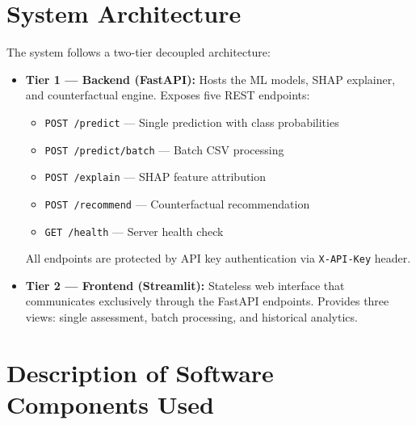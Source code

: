 \documentclass[12pt,a4paper]{report}
\begin{document}
\section{System Architecture}

The system follows a two-tier decoupled architecture:

\begin{itemize}
    \item \textbf{Tier 1 --- Backend (FastAPI):} Hosts the ML models, SHAP explainer, and counterfactual engine. Exposes five REST endpoints:
    \begin{itemize}
        \item \texttt{POST /predict} --- Single prediction with class probabilities
        \item \texttt{POST /predict/batch} --- Batch CSV processing
        \item \texttt{POST /explain} --- SHAP feature attribution
        \item \texttt{POST /recommend} --- Counterfactual recommendation
        \item \texttt{GET /health} --- Server health check
    \end{itemize}
    All endpoints are protected by API key authentication via \texttt{X-API-Key} header.

    \item \textbf{Tier 2 --- Frontend (Streamlit):} Stateless web interface that communicates exclusively through the FastAPI endpoints. Provides three views: single assessment, batch processing, and historical analytics.
\end{itemize}

\section{Description of Software Components Used}
\end{document}
